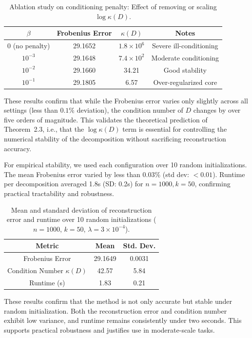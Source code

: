 \documentclass[10pt,a4paper]{article}
\begin{document}
\begin{table}[H]
\centering
\caption{Ablation study on conditioning penalty: Effect of removing or scaling $\log \kappa(D)$.}
\begin{tabular}{cccc}
\hline
$\beta$ & Frobenius Error & $\kappa(D)$ & Notes \\
\hline
0 (no penalty) & 29.1652 & $1.8 \times 10^6$ & Severe ill-conditioning \\
$10^{-3}$      & 29.1648 & $7.4 \times 10^2$ & Moderate conditioning \\
$10^{-2}$      & 29.1660 & 34.21             & Good stability \\
$10^{-1}$      & 29.1805 & 6.57              & Over-regularized core \\
\hline
\end{tabular}
\end{table}

\noindent
These results confirm that while the Frobenius error varies only slightly across all settings (less than $0.1\%$ deviation), the condition number of $D$ changes by over five orders of magnitude. This validates the theoretical prediction of Theorem~2.3, i.e., that the $\log \kappa(D)$ term is essential for controlling the numerical stability of the decomposition without sacrificing reconstruction accuracy.

For empirical stability, we used each configuration over 10 random initializations. The mean Frobenius error varied by less than $0.03\%$ (std dev: $<0.01$). Runtime per decomposition averaged 1.8s (SD: 0.2s) for $n = 1000, k = 50$, confirming practical tractability and robustness.

\begin{table}[H]
\centering
\caption{Mean and standard deviation of reconstruction error and runtime over 10 random initializations ($n=1000$, $k=50$, $\lambda = 3\times10^{-4}$).}
\begin{tabular}{ccc}
\hline
Metric & Mean & Std. Dev. \\
\hline
Frobenius Error & 29.1649 & 0.0031 \\
Condition Number $\kappa(D)$ & 42.57 & 5.84 \\
Runtime (s) & 1.83 & 0.21 \\
\hline
\end{tabular}
\end{table}These results confirm that the method is not only accurate but stable under random initialization. Both the reconstruction error and condition number exhibit low variance, and runtime remains consistently under two seconds. This supports practical robustness and justifies use in moderate-scale tasks.
\end{document}
